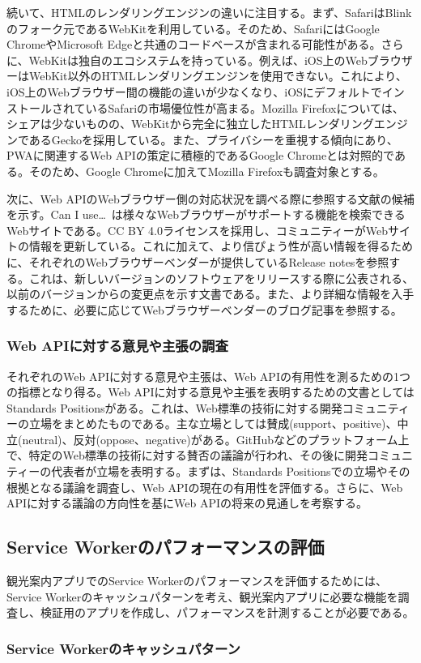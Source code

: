 続いて、HTMLのレンダリングエンジンの違いに注目する。まず、SafariはBlinkのフォーク元であるWebKitを利用している。そのため、SafariにはGoogle ChromeやMicrosoft Edgeと共通のコードベースが含まれる可能性がある。さらに、WebKitは独自のエコシステムを持っている。例えば、iOS上のWebブラウザーはWebKit以外のHTMLレンダリングエンジンを使用できない。これにより、iOS上のWebブラウザー間の機能の違いが少なくなり、iOSにデフォルトでインストールされているSafariの市場優位性が高まる。Mozilla Firefoxについては、シェアは少ないものの、WebKitから完全に独立したHTMLレンダリングエンジンであるGeckoを採用している。また、プライバシーを重視する傾向にあり、PWAに関連するWeb APIの策定に積極的であるGoogle Chromeとは対照的である。そのため、Google Chromeに加えてMozilla Firefoxも調査対象とする。

次に、Web APIのWebブラウザー側の対応状況を調べる際に参照する文献の候補を示す。Can I use…~\cite{CanIUse}は様々なWebブラウザーがサポートする機能を検索できるWebサイトである。CC BY 4.0ライセンスを採用し、コミュニティーがWebサイトの情報を更新している。これに加えて、より信ぴょう性が高い情報を得るために、それぞれのWebブラウザーベンダーが提供しているRelease notesを参照する。これは、新しいバージョンのソフトウェアをリリースする際に公表される、以前のバージョンからの変更点を示す文書である。また、より詳細な情報を入手するために、必要に応じてWebブラウザーベンダーのブログ記事を参照する。
\subsubsection{Web APIに対する意見や主張の調査}\label{subsubsection:Web APIに対する意見や主張の調査}
それぞれのWeb APIに対する意見や主張は、Web APIの有用性を測るための1つの指標となり得る。Web APIに対する意見や主張を表明するための文書としてはStandards Positionsがある。これは、Web標準の技術に対する開発コミュニティーの立場をまとめたものである。主な立場としては賛成(support、positive)、中立(neutral)、反対(oppose、negative)がある。GitHubなどのプラットフォーム上で、特定のWeb標準の技術に対する賛否の議論が行われ、その後に開発コミュニティーの代表者が立場を表明する。まずは、Standards Positionsでの立場やその根拠となる議論を調査し、Web APIの現在の有用性を評価する。さらに、Web APIに対する議論の方向性を基にWeb APIの将来の見通しを考察する。
\subsection{Service Workerのパフォーマンスの評価}\label{subsection:Service Workerのパフォーマンスの評価}
観光案内アプリでのService Workerのパフォーマンスを評価するためには、Service Workerのキャッシュパターンを考え、観光案内アプリに必要な機能を調査し、検証用のアプリを作成し、パフォーマンスを計測することが必要である。
\subsubsection{Service Workerのキャッシュパターン}\label{Service Workerのキャッシュパターン}
